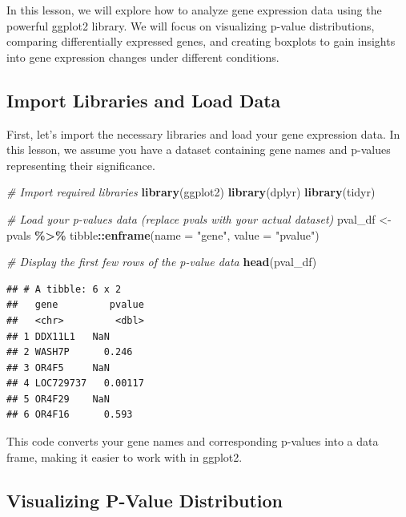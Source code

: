 \documentclass[
]{book}
\newenvironment{Shaded}{\begin{snugshade}}{\end{snugshade}}
\newcommand{\AttributeTok}[1]{\textcolor[rgb]{0.13,0.29,0.53}{#1}}
\newcommand{\CommentTok}[1]{\textcolor[rgb]{0.56,0.35,0.01}{\textit{#1}}}
\newcommand{\FunctionTok}[1]{\textcolor[rgb]{0.13,0.29,0.53}{\textbf{#1}}}
\newcommand{\NormalTok}[1]{#1}
\newcommand{\OtherTok}[1]{\textcolor[rgb]{0.56,0.35,0.01}{#1}}
\newcommand{\SpecialCharTok}[1]{\textcolor[rgb]{0.81,0.36,0.00}{\textbf{#1}}}
\newcommand{\StringTok}[1]{\textcolor[rgb]{0.31,0.60,0.02}{#1}}
\begin{document}
In this lesson, we will explore how to analyze gene expression data using the powerful ggplot2 library. We will focus on visualizing p-value distributions, comparing differentially expressed genes, and creating boxplots to gain insights into gene expression changes under different conditions.

\hypertarget{import-libraries-and-load-data}{%
\subsection{Import Libraries and Load Data}\label{import-libraries-and-load-data}}

First, let's import the necessary libraries and load your gene expression data. In this lesson, we assume you have a dataset containing gene names and p-values representing their significance.

\begin{Shaded}
\begin{Highlighting}[]
\CommentTok{\# Import required libraries}
\FunctionTok{library}\NormalTok{(ggplot2)}
\FunctionTok{library}\NormalTok{(dplyr)}
\FunctionTok{library}\NormalTok{(tidyr)}

\CommentTok{\# Load your p{-}values data (replace \textquotesingle{}pvals\textquotesingle{} with your actual dataset)}
\NormalTok{pval\_df }\OtherTok{\textless{}{-}}\NormalTok{ pvals }\SpecialCharTok{\%\textgreater{}\%}
\NormalTok{  tibble}\SpecialCharTok{::}\FunctionTok{enframe}\NormalTok{(}\AttributeTok{name =} \StringTok{"gene"}\NormalTok{, }\AttributeTok{value =} \StringTok{"pvalue"}\NormalTok{)}

\CommentTok{\# Display the first few rows of the p{-}value data}
\FunctionTok{head}\NormalTok{(pval\_df)}
\end{Highlighting}
\end{Shaded}

\begin{verbatim}
## # A tibble: 6 x 2
##   gene         pvalue
##   <chr>         <dbl>
## 1 DDX11L1   NaN      
## 2 WASH7P      0.246  
## 3 OR4F5     NaN      
## 4 LOC729737   0.00117
## 5 OR4F29    NaN      
## 6 OR4F16      0.593
\end{verbatim}

This code converts your gene names and corresponding p-values into a data frame, making it easier to work with in ggplot2.

\hypertarget{visualizing-p-value-distribution}{%
\subsection{Visualizing P-Value Distribution}\label{visualizing-p-value-distribution}}
\end{document}
